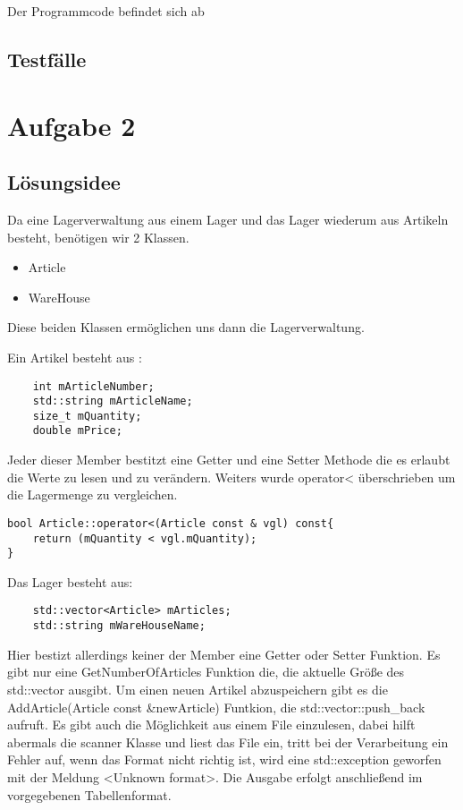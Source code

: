 \documentclass[a4paper,oneside,openany]{tufte-book}
\begin{document}
Der Programmcode befindet sich ab 
\newpage
\section{Testf\"{a}lle}






\chapter{Aufgabe 2}

\section{L\"{o}sungsidee}

Da eine Lagerverwaltung aus einem Lager und das Lager wiederum aus Artikeln besteht, benötigen wir 2 Klassen.
\begin{itemize}
  \item Article
  \item WareHouse
\end{itemize}
Diese beiden Klassen ermöglichen uns dann die Lagerverwaltung.

Ein Artikel besteht aus :
\begin{lstlisting}
    int mArticleNumber;
    std::string mArticleName;
    size_t mQuantity;
    double mPrice;
\end{lstlisting}
Jeder dieser Member bestitzt eine Getter und eine Setter Methode die es erlaubt die Werte zu lesen und zu verändern. Weiters wurde operator< überschrieben um die Lagermenge zu vergleichen.
\begin{lstlisting}
bool Article::operator<(Article const & vgl) const{
    return (mQuantity < vgl.mQuantity);
}
\end{lstlisting}

Das Lager besteht aus:
\begin{lstlisting}
    std::vector<Article> mArticles;
    std::string mWareHouseName;
\end{lstlisting}
Hier bestizt allerdings keiner der Member eine Getter oder Setter Funktion. Es gibt nur eine GetNumberOfArticles Funktion die, die aktuelle Größe des std::vector ausgibt.
Um einen neuen Artikel abzuspeichern gibt es die AddArticle(Article const \&newArticle) Funtkion, die std::vector::push\_back aufruft.
Es gibt auch die Möglichkeit aus einem File einzulesen, dabei hilft abermals die scanner Klasse und liest das File ein, tritt bei der Verarbeitung ein Fehler auf, 
wenn das Format nicht richtig ist, wird eine std::exception geworfen mit der Meldung <Unknown format>.
Die Ausgabe erfolgt anschließend im vorgegebenen Tabellenformat.
\end{document}
